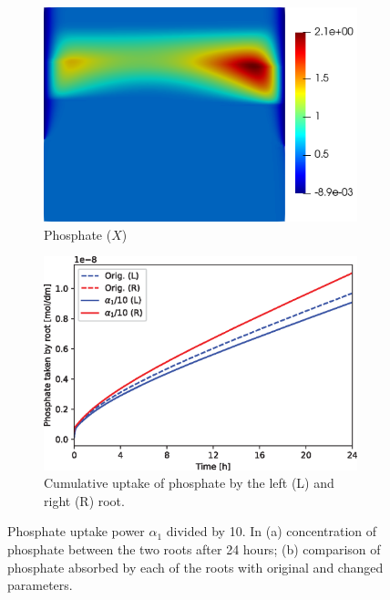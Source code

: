 \documentclass[11pt]{article}
\numberwithin{equation}{section}
\begin{document}
\begin{figure}[!htb]
\centering
\begin{subfigure}[t]{0.35\textwidth}
    \includegraphics[width=\textwidth]{Figures/X_alpha1divby10.png}
    \caption{Phosphate ($X$)}
    \label{fig:numexp_a1_down1}
\end{subfigure}
\hspace{1cm}
\begin{subfigure}[t]{0.4\textwidth}
    \includegraphics[width=\textwidth]{Figures/alpha1divby10.eps}
    \caption{Cumulative uptake of phosphate by the left (L) and right (R) root.}
    \label{fig:numexp_a1_down2}
\end{subfigure}

\caption{Phosphate uptake power $\alpha_1$ divided by 10. In (a) concentration of phosphate between the two roots after 24 hours; (b) comparison of phosphate absorbed by each of the roots with original and changed parameters.}
\label{fig:numexp_a1_down}
\end{figure}
\end{document}
